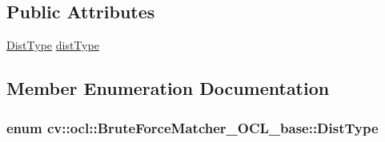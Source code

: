 \subsection*{Public Attributes}
\begin{DoxyCompactItemize}
\item 
\hyperlink{classcv_1_1ocl_1_1BruteForceMatcher__OCL__base_a138bb23658e4007b7bb3c0f294075e68}{Dist\-Type} \hyperlink{classcv_1_1ocl_1_1BruteForceMatcher__OCL__base_a5f9e04f63994ff96aa4a6b17b11f6f8c}{dist\-Type}
\end{DoxyCompactItemize}


\subsection{Member Enumeration Documentation}
\hypertarget{classcv_1_1ocl_1_1BruteForceMatcher__OCL__base_a138bb23658e4007b7bb3c0f294075e68}{
\subsubsection[{Dist\-Type}]{\setlength{\rightskip}{0pt plus 5cm}enum {\bf cv\-::ocl\-::\-Brute\-Force\-Matcher\-\_\-\-O\-C\-L\-\_\-base\-::\-Dist\-Type}}}\label{classcv_1_1ocl_1_1BruteForceMatcher__OCL__base_a138bb23658e4007b7bb3c0f294075e68}
